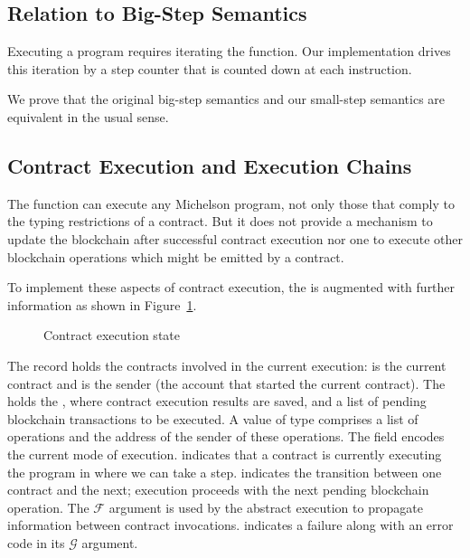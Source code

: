 \subsection{Relation to Big-Step Semantics}
\label{sec:relation-big-step}


Executing a program requires iterating the 
function. Our implementation drives this iteration
by a step counter that is counted
down at each instruction.
\ConcreteprogStepStar

We prove that the original big-step semantics and our small-step
semantics are equivalent in the usual sense.
\BigstepToSmallstep
\BigstepFromSmallstep

\subsection{Contract Execution and Execution Chains}\label{sec:contract-execution}

The  function can execute any Michelson program, not only those that comply
to the typing restrictions of a contract.
But it does not provide a mechanism to update the blockchain after successful contract execution
nor one to execute other blockchain operations which might be emitted by a contract.



To implement these aspects of contract execution, the 
is augmented with further information as shown in Figure~\ref{fig:contract-execution-state}.
\begin{figure}[tp]
  \ConcretePrgRunning
  \ConcreteTransaction
  \ConcreteRunMode
  \ConcreteExecState
  \caption{Contract execution state}
  \label{fig:contract-execution-state}
\end{figure}
The record  holds the contracts involved in the current
execution:  is the current contract and  is
the sender (the account that started the current contract).
The  holds the , where contract execution results are saved,
and a list of pending blockchain transactions to be executed. A value
of type  comprises a list of operations and the
address of the sender of these operations.
The field  encodes the current mode of
execution.  indicates that a contract is currently executing
the program in  where we can take a step. 
indicates the transition between one contract and the next; execution
proceeds with the next pending blockchain operation. The $\mathcal{F}$
argument is used by the abstract execution to propagate information
between contract invocations.  indicates a failure along
with an error code in its $\mathcal{G}$ argument.

